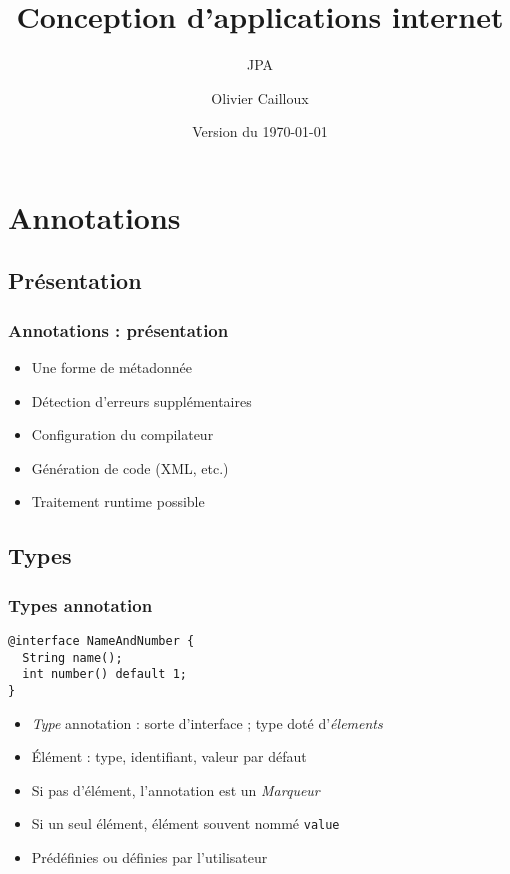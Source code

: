 \documentclass[english, french]{beamer}
\title{Conception d’applications internet}
\subtitle{JPA}
\author{Olivier Cailloux}
\institute[LAMSADE]{LAMSADE, Université Paris-Dauphine}
\date{Version du \today}
\begin{document}


\begin{frame}[plain]
   \titlepage
\end{frame}
\addtocounter{framenumber}{-1}

\section{Annotations}
\subsection{Présentation}
\begin{frame}
	\frametitle{Annotations : présentation}
	\begin{itemize}
		\item Une forme de métadonnée
		\item Détection d’erreurs supplémentaires
		\item Configuration du compilateur
		\item Génération de code (XML, etc.)
		\item Traitement runtime possible
	\end{itemize}
\end{frame}

\subsection{Types}
\begin{frame}[fragile]
	\frametitle{Types annotation}
	\begin{lstlisting}
@interface NameAndNumber {
  String name();
  int number() default 1;
}
	\end{lstlisting}
	\begin{itemize}
		\item \emph{Type} annotation : sorte d’interface ; type doté d’\emph{élements}
		\item Élément : type, identifiant, valeur par défaut
		\item Si pas d’élément, l’annotation est un \emph{Marqueur}
		\item Si un seul élément, élément souvent nommé \texttt{value}
		\item Prédéfinies ou définies par l’utilisateur
	\end{itemize}
\end{frame}
\end{document}
